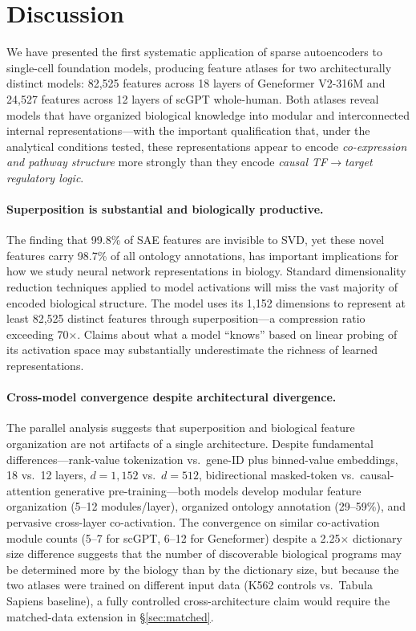 \documentclass[onecolumn]{article}
\begin{document}
\section{Discussion}

\label{sec:discussion}
We have presented the first systematic application of sparse autoencoders to single-cell foundation models, producing feature atlases for two architecturally distinct models: 82,525 features across 18 layers of Geneformer V2-316M and 24,527 features across 12 layers of scGPT whole-human. Both atlases reveal models that have organized biological knowledge into modular and interconnected internal representations---with the important qualification that, under the analytical conditions tested, these representations appear to encode \emph{co-expression and pathway structure} more strongly than they encode \emph{causal TF$\to$target regulatory logic}.

\paragraph{Superposition is substantial and biologically productive.}
The finding that 99.8\% of SAE features are invisible to SVD, yet these novel features carry 98.7\% of all ontology annotations, has important implications for how we study neural network representations in biology. Standard dimensionality reduction techniques applied to model activations will miss the vast majority of encoded biological structure. The model uses its 1,152 dimensions to represent at least 82,525 distinct features through superposition---a compression ratio exceeding 70$\times$. Claims about what a model ``knows'' based on linear probing of its activation space may substantially underestimate the richness of learned representations.

\paragraph{Cross-model convergence despite architectural divergence.}
The parallel analysis suggests that superposition and biological feature organization are not artifacts of a single architecture. Despite fundamental differences---rank-value tokenization vs.\ gene-ID plus binned-value embeddings, 18 vs.\ 12 layers, $d{=}1{,}152$ vs.\ $d{=}512$, bidirectional masked-token vs.\ causal-attention generative pre-training---both models develop modular feature organization (5--12 modules/layer), organized ontology annotation (29--59\%), and pervasive cross-layer co-activation. The convergence on similar co-activation module counts (5--7 for scGPT, 6--12 for Geneformer) despite a 2.25$\times$ dictionary size difference suggests that the number of discoverable biological programs may be determined more by the biology than by the dictionary size, but because the two atlases were trained on different input data (K562 controls vs.\ Tabula Sapiens baseline), a fully controlled cross-architecture claim would require the matched-data extension in \S\ref{sec:matched}.
\end{document}
